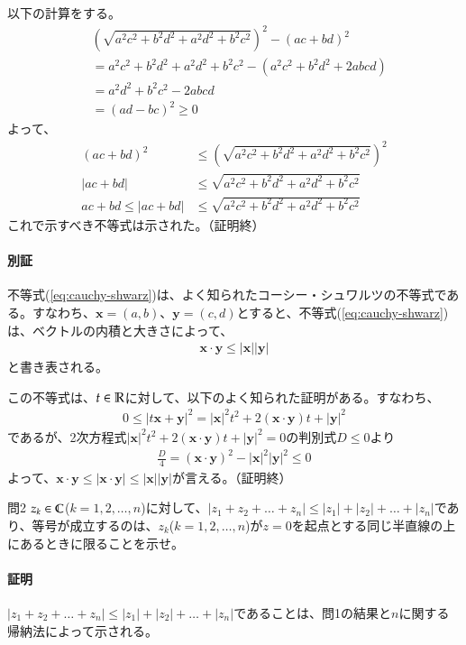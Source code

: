 以下の計算をする。
\begin{align}
    &\left(\sqrt{a^2c^2+b^2d^2+a^2d^2+b^2c^2}\right)^2-(ac+bd)^2\nonumber\\
    &=a^2c^2+b^2d^2+a^2d^2+b^2c^2-(a^2c^2+b^2d^2+2abcd)\nonumber\\
    &=a^2d^2+b^2c^2-2abcd\nonumber\\
    &=(ad-bc)^2\ge0\label{eq:togo}
\end{align}
よって、
\begin{align*}
    (ac+bd)^2&\le\left(\sqrt{a^2c^2+b^2d^2+a^2d^2+b^2c^2}\right)^2\\
    |ac+bd|&\le\sqrt{a^2c^2+b^2d^2+a^2d^2+b^2c^2}\\
    ac+bd\le|ac+bd|&\le\sqrt{a^2c^2+b^2d^2+a^2d^2+b^2c^2}
\end{align*}
これで示すべき不等式は示された。（証明終）

\paragraph{別証}
不等式(\ref{eq:cauchy-shwarz})は、よく知られたコーシー・シュワルツの不等式である。すなわち、$\bm{x}=(a,b)$、$\bm{y}=(c,d)$とすると、不等式(\ref{eq:cauchy-shwarz})は、ベクトルの内積と大きさによって、
\begin{align}
    \bm{x}\cdot \bm{y}\le|\bm{x}||\bm{y}|\label{eq:cauchy-shwarz0}
\end{align}
と書き表される。

この不等式は、$t\in\mathbb{R}$に対して、以下のよく知られた証明がある。すなわち、
\begin{align*}
    0\le|t\bm{x}+\bm{y}|^2
    =|\bm{x}|^2t^2+2(\bm{x}\cdot\bm{y})t+|\bm{y}|^2
\end{align*}
であるが、2次方程式$|\bm{x}|^2t^2+2(\bm{x}\cdot\bm{y})t+|\bm{y}|^2=0$の判別式$D\le 0$より
\begin{align*}
    \frac{D}{4}=(\bm{x}\cdot\bm{y})^2-|\bm{x}|^2|\bm{y}|^2\le 0
\end{align*}
よって、$\bm{x}\cdot\bm{y}\le|\bm{x}\cdot\bm{y}|\le|\bm{x}||\bm{y}|$が言える。（証明終）

\begin{mysimplebox}{問2}
    $z_k\in\mathbb{C}$($k=1,2,\dots,n$)に対して、$|z_1+z_2+\dots+z_n|\le|z_1|+|z_2|+\dots+|z_n|$であり、等号が成立するのは、$z_k$($k=1,2,\dots,n$)が$z=0$を起点とする同じ半直線の上にあるときに限ることを示せ。
\end{mysimplebox}
\paragraph{証明}
$|z_1+z_2+\dots+z_n|\le|z_1|+|z_2|+\dots+|z_n|$であることは、問1の結果と$n$に関する帰納法によって示される。

